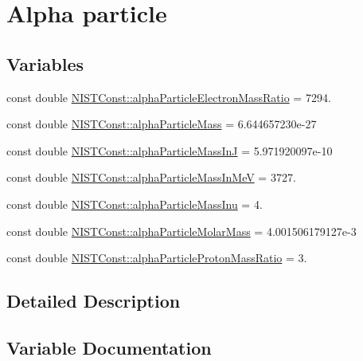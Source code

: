 \hypertarget{group___alpha}{}\section{Alpha particle}
\label{group___alpha}
\subsection*{Variables}
\begin{DoxyCompactItemize}
\item 
const double \hyperlink{group___alpha_ga9f00b32c60f1bc5b8a950b58e64d08c8}{N\+I\+S\+T\+Const\+::alpha\+Particle\+Electron\+Mass\+Ratio} = 7294.
\item 
const double \hyperlink{group___alpha_ga5a2a4f4310d2e3584253471fe4381b93}{N\+I\+S\+T\+Const\+::alpha\+Particle\+Mass} = 6.\+644657230e-\/27
\item 
const double \hyperlink{group___alpha_ga4a65b49a93c81dff12ac24366f68e4e9}{N\+I\+S\+T\+Const\+::alpha\+Particle\+Mass\+InJ} = 5.\+971920097e-\/10
\item 
const double \hyperlink{group___alpha_ga8dd1d38f58ef9d77f39c26be9bb849e0}{N\+I\+S\+T\+Const\+::alpha\+Particle\+Mass\+In\+MeV} = 3727.
\item 
const double \hyperlink{group___alpha_ga1233ffb0d6537e112ce39623e6c6d0d5}{N\+I\+S\+T\+Const\+::alpha\+Particle\+Mass\+Inu} = 4.
\item 
const double \hyperlink{group___alpha_ga06d92f78de04d4e1d79b8468b04959ef}{N\+I\+S\+T\+Const\+::alpha\+Particle\+Molar\+Mass} = 4.\+001506179127e-\/3
\item 
const double \hyperlink{group___alpha_ga4629465057dc35ad7eecca610bcbd092}{N\+I\+S\+T\+Const\+::alpha\+Particle\+Proton\+Mass\+Ratio} = 3.
\end{DoxyCompactItemize}


\subsection{Detailed Description}


\subsection{Variable Documentation}
\mbox{\label{group___alpha_ga9f00b32c60f1bc5b8a950b58e64d08c8}} 
